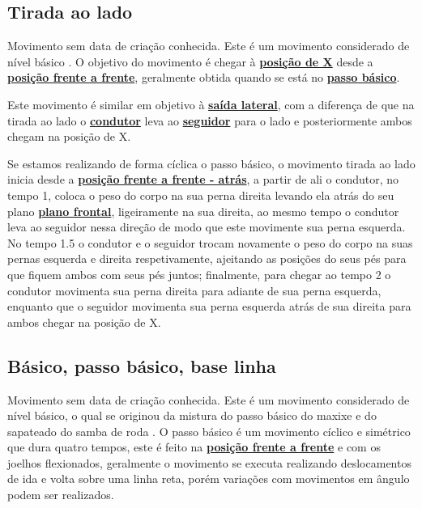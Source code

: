 \subsection{Tirada ao lado}
\label{subsec:tiradaaolado}

Movimento sem data de criação conhecida.
Este é um movimento considerado de nível básico \cite[pp. 144]{perna2002samba}.
O objetivo do movimento é chegar à \hyperref[def:X-position]{\textbf{posição de X}} 
desde a \hyperref[def:frente-frente-position]{\textbf{posição frente a frente}}, 
geralmente obtida quando se está no \hyperref[subsec:passobasico]{\textbf{passo básico}}. 

Este movimento é similar em objetivo à \hyperref[subsec:saidalateral]{\textbf{saída lateral}},
com a diferença de que na tirada ao lado o \hyperref[def:Condutor]{\textbf{condutor}} 
leva ao \hyperref[def:Seguidor]{\textbf{seguidor}} para o lado e posteriormente ambos
chegam na posição de X.


Se estamos realizando de forma cíclica o passo básico, o movimento tirada ao lado
inicia desde a \hyperref[def:ffa-position]{\textbf{posição frente a frente - atrás}},
a partir de ali o condutor, no tempo 1, 
coloca o peso do corpo na sua perna direita levando ela atrás do seu plano 
\hyperref[def:PlanoFrontal]{\textbf{plano frontal}}, ligeiramente na sua direita,
ao mesmo tempo o condutor leva ao seguidor nessa direção de modo que este movimente sua perna esquerda.
No tempo 1.5 o condutor e o seguidor trocam novamente o peso do corpo na suas pernas esquerda e direita respetivamente, 
ajeitando as posições do seus pés para que fiquem ambos com seus pés juntos;
finalmente, para chegar ao tempo 2 o condutor movimenta sua perna direita para adiante de sua perna esquerda,
enquanto que o seguidor movimenta sua perna esquerda atrás de sua direita para 
ambos chegar na posição de X.
 
 
\subsection{Básico, passo básico, base linha}
\label{subsec:passobasico}

Movimento sem data de criação conhecida.
Este é um movimento considerado de nível básico, o qual se originou da mistura do 
passo básico do maxixe e do sapateado do samba de roda \cite[pp. 144, 146]{perna2002samba}.
O passo básico é um movimento cíclico e simétrico que dura quatro tempos, 
este é feito na \hyperref[def:frente-frente-position]{\textbf{posição frente a frente}}
e com os joelhos flexionados, geralmente o movimento se executa realizando deslocamentos de ida e volta sobre uma linha reta, 
porém variações com movimentos em ângulo podem ser realizados.

